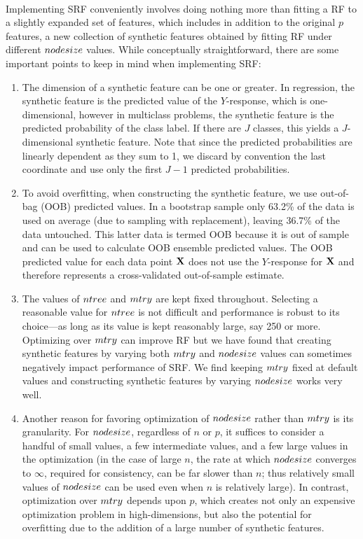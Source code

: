 \documentclass{bmcart}
\def\mtry{{\sl mtry }}
\def\ntree{{\sl ntree }}
\def\nodesize{{\sl nodesize }}
\def\X{{\bf X}}
\begin{document}
\\ Implementing SRF conveniently involves doing
nothing more than fitting a RF to a slightly expanded set of features,
which includes in addition to the original $p$ features, a new
collection of synthetic features obtained by fitting RF under
different $\nodesize$ values.  While conceptually straightforward, there
are some important points to keep in mind when implementing SRF:

\vskip5pt
\begin{enumerate}
\item
The dimension of a synthetic feature can be one or greater.  In
regression, the synthetic feature is the predicted value of the
$Y$-response, which is one-dimensional, however in multiclass problems,
the synthetic feature is the predicted probability of the class
label.  If there are $J$ classes, this yields a $J$-dimensional
synthetic feature.  Note that since the predicted probabilities are
linearly dependent as they sum to 1, we discard by convention the last
coordinate and use only the first $J-1$ predicted probabilities.
\item
To avoid overfitting, when constructing the synthetic feature, we use
out-of-bag (OOB) predicted values.  In a bootstrap sample only 63.2\%
of the data is used on average (due to sampling with replacement),
leaving 36.7\% of the data untouched.  This latter data is termed OOB
because it is out of sample and can be used to calculate OOB ensemble
predicted values.  The OOB predicted value for each data point $\X$ does
not use the $Y$-response for $\X$ and therefore represents a cross-validated
out-of-sample estimate.
\item
The values of $\ntree$ and $\mtry$ are kept fixed throughout.
Selecting a reasonable value for $\ntree$ is not difficult and
performance is robust to its choice---as long as its value is kept
reasonably large, say 250 or more.  Optimizing over $\mtry$ can
improve RF but we have found that creating synthetic features by
varying both $\mtry$ and $\nodesize$ values can sometimes negatively
impact performance of SRF.  We find keeping $\mtry$ fixed at default
values and constructing synthetic features by varying $\nodesize$
works very well.
\item
Another reason for favoring optimization of $\nodesize$ rather than
$\mtry$ is its granularity.  For $\nodesize$, regardless of $n$ or
$p$, it suffices to consider a handful of small values, a few
intermediate values, and a few large values in the optimization (in
the case of large $n$, the rate at which $\nodesize$ converges to
$\infty$, required for consistency, can be far slower than $n$; thus
relatively small values of $\nodesize$ can be used even when $n$ is
relatively large).  In contrast, optimization over $\mtry$ depends
upon $p$, which creates not only an expensive optimization problem in
high-dimensions, but also the potential for overfitting due to the
addition of a large number of synthetic features.

\end{enumerate}
\end{document}

